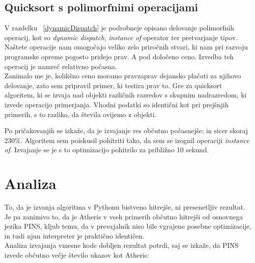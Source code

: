 \documentclass[a4paper, 12p]{book}
\begin{document}

\subsection{Quicksort s polimorfnimi operacijami}

V razdelku ~\ref{dynamicDispatch} je podrobneje opisano delovanje polimorfnih operacij, kot so \textit{dynamic dispatch}, \textit{instance of} operator ter pretvarjanje tipov. Naštete operacije nam omogočajo veliko zelo priročnih stvari, ki nam pri razvoju programske opreme pogosto pridejo prav. A pod določeno ceno. Izvedba teh operacij je namreč relativno počasna. \\
\indent Zanimalo me je, kolikšno ceno moramo pravzaprav dejansko plačati za njihovo delovanje, zato sem pripravil primer, ki testira prav to. Gre za quicksort algoritem, ki se izvaja nad objekti različnih razredov s skupnim nadrazredom, ki izvede operacijo primerjanja. Vhodni podatki so identični kot pri prejšnjih primerih, s to razliko, da števila ovijemo z objekti.\\


Po pričakovanjih se izkaže, da je izvajanje res občutno počasnejše; in sicer skoraj 230\%. Algoritem sem poiskusil pohitriti tako, da sem se izognil operaciji \textit{instance of}. Izvajanje se je s to optimizacijo pohitrilo za približno 10 sekund.

\section{Analiza}

To, da je izvanja algoritma v Pythonu bistveno hitrejše, ni presenetljiv rezultat. Je pa zanimivo to, da je Atheris v vseh primerih občutno hitrejši od osnovnega jezika PINS, kljub temu, da v prevajalnik niso bile vgrajene posebne optimizacije, in tudi njun interpreter je praktično identičen. \\
\indent Analiza izvajanja vmesne kode dobljen rezultat potrdi, saj se izkaže, da PINS izvede občutno večje število ukazov kot Atheris: \\
\end{document}
